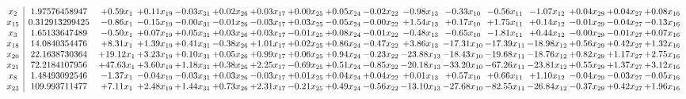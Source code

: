 \documentclass[9pt]{article}
\begin{document}
 \[\begin{array}{c| c c@{\hskip 2pt} c@{\hskip 2pt} c@{\hskip 2pt} c@{\hskip 2pt} c@{\hskip 2pt} c@{\hskip 2pt} c@{\hskip 2pt} c@{\hskip 2pt} c@{\hskip 2pt} c@{\hskip 2pt} c@{\hskip 2pt} c@{\hskip 2pt} c@{\hskip 2pt} c@{\hskip 2pt} c@{\hskip 2pt} }
 x_{2}   &  1.97576458947 & +  0.59 x_{1} & +  0.11 x_{19} & -0.03 x_{31} & +  0.02 x_{26} & +  0.03 x_{17} & +  0.00 x_{25} & +  0.05 x_{24} & -0.02 x_{22} & -0.98 x_{13} & -0.33 x_{10} & -0.56 x_{11} & -1.07 x_{12} & +  0.04 x_{29} & +  0.04 x_{27} & +  0.08 x_{16}\\
 x_{15}   &  0.312913299425 & -0.86 x_{1} & -0.15 x_{19} & -0.00 x_{31} & -0.01 x_{26} & -0.03 x_{17} & +  0.03 x_{25} & -0.05 x_{24} & -0.00 x_{22} & +  1.54 x_{13} & +  0.17 x_{10} & +  1.75 x_{11} & +  0.14 x_{12} & -0.01 x_{29} & -0.04 x_{27} & -0.13 x_{16}\\
 x_{3}   &  1.65133647489 & -0.50 x_{1} & +  0.07 x_{19} & +  0.05 x_{31} & +  0.03 x_{26} & +  0.03 x_{17} & -0.01 x_{25} & +  0.08 x_{24} & -0.01 x_{22} & -0.48 x_{13} & -0.65 x_{10} & -1.81 x_{11} & +  0.44 x_{12} & -0.00 x_{29} & -0.01 x_{27} & +  0.07 x_{16}\\
 x_{18}   &  14.0840354476 & +  8.31 x_{1} & +  1.39 x_{19} & +  0.41 x_{31} & -0.38 x_{26} & +  1.01 x_{17} & +  0.02 x_{25} & +  0.86 x_{24} & -0.47 x_{22} & +  3.86 x_{13} & -17.31 x_{10} & -17.39 x_{11} & -18.98 x_{12} & +  0.56 x_{29} & +  0.42 x_{27} & +  1.32 x_{16}\\
 x_{20}   &  22.1638730364 & + 19.12 x_{1} & +  3.23 x_{19} & +  0.10 x_{31} & +  0.05 x_{26} & +  0.99 x_{17} & +  0.06 x_{25} & +  0.94 x_{24} & -0.23 x_{22} & -23.88 x_{13} & -18.43 x_{10} & -19.68 x_{11} & -18.76 x_{12} & +  0.82 x_{29} & +  1.17 x_{27} & +  2.75 x_{16}\\
 x_{21}   &  72.2184107956 & + 47.63 x_{1} & +  3.60 x_{19} & +  1.18 x_{31} & +  0.38 x_{26} & +  2.25 x_{17} & -0.69 x_{25} & +  0.51 x_{24} & -0.85 x_{22} & -20.18 x_{13} & -33.20 x_{10} & -67.26 x_{11} & -23.81 x_{12} & +  0.55 x_{29} & +  1.37 x_{27} & +  3.12 x_{16}\\
 x_{8}   &  1.48493092546 & -1.37 x_{1} & -0.04 x_{19} & -0.03 x_{31} & +  0.03 x_{26} & -0.03 x_{17} & +  0.01 x_{25} & +  0.04 x_{24} & +  0.04 x_{22} & +  0.01 x_{13} & +  0.57 x_{10} & +  0.66 x_{11} & +  1.10 x_{12} & -0.04 x_{29} & -0.03 x_{27} & -0.05 x_{16}\\
 x_{23}   &  109.993711477 & +  7.11 x_{1} & +  2.48 x_{19} & +  1.44 x_{31} & +  0.73 x_{26} & +  2.31 x_{17} & -0.21 x_{25} & +  0.49 x_{24} & -0.56 x_{22} & -13.10 x_{13} & -27.68 x_{10} & -82.55 x_{11} & -26.84 x_{12} & -0.37 x_{29} & +  0.42 x_{27} & +  1.96 x_{16}\\

\end{array}\]
\end{document}
